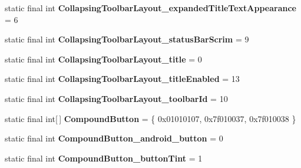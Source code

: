 \begin{DoxyCompactItemize}
\item 
\hypertarget{classandroid_1_1support_1_1design_1_1_r_1_1styleable_a5810888dea70dffb7d52060a911d78aa}{}static final int {\bfseries Collapsing\+Toolbar\+Layout\+\_\+expanded\+Title\+Text\+Appearance} = 6\label{classandroid_1_1support_1_1design_1_1_r_1_1styleable_a5810888dea70dffb7d52060a911d78aa}

\item 
\hypertarget{classandroid_1_1support_1_1design_1_1_r_1_1styleable_a9a2f53e59e0ce9c6cf463013300a02a4}{}static final int {\bfseries Collapsing\+Toolbar\+Layout\+\_\+status\+Bar\+Scrim} = 9\label{classandroid_1_1support_1_1design_1_1_r_1_1styleable_a9a2f53e59e0ce9c6cf463013300a02a4}

\item 
\hypertarget{classandroid_1_1support_1_1design_1_1_r_1_1styleable_ad1b550d16ea4dc77615ec73e00300c09}{}static final int {\bfseries Collapsing\+Toolbar\+Layout\+\_\+title} = 0\label{classandroid_1_1support_1_1design_1_1_r_1_1styleable_ad1b550d16ea4dc77615ec73e00300c09}

\item 
\hypertarget{classandroid_1_1support_1_1design_1_1_r_1_1styleable_a653a3ffa637cabbce960a62a3ace1972}{}static final int {\bfseries Collapsing\+Toolbar\+Layout\+\_\+title\+Enabled} = 13\label{classandroid_1_1support_1_1design_1_1_r_1_1styleable_a653a3ffa637cabbce960a62a3ace1972}

\item 
\hypertarget{classandroid_1_1support_1_1design_1_1_r_1_1styleable_ad0d7a6184e81edf8ac6520145708bb74}{}static final int {\bfseries Collapsing\+Toolbar\+Layout\+\_\+toolbar\+Id} = 10\label{classandroid_1_1support_1_1design_1_1_r_1_1styleable_ad0d7a6184e81edf8ac6520145708bb74}

\item 
\hypertarget{classandroid_1_1support_1_1design_1_1_r_1_1styleable_a1e3ef000b9dccc62673df5ec6d13a547}{}static final int\mbox{[}$\,$\mbox{]} {\bfseries Compound\+Button} = \{ 0x01010107, 0x7f010037, 0x7f010038 \}\label{classandroid_1_1support_1_1design_1_1_r_1_1styleable_a1e3ef000b9dccc62673df5ec6d13a547}

\item 
\hypertarget{classandroid_1_1support_1_1design_1_1_r_1_1styleable_a6d7b51f19ad5b7b394b8fc42c69a09ec}{}static final int {\bfseries Compound\+Button\+\_\+android\+\_\+button} = 0\label{classandroid_1_1support_1_1design_1_1_r_1_1styleable_a6d7b51f19ad5b7b394b8fc42c69a09ec}

\item 
\hypertarget{classandroid_1_1support_1_1design_1_1_r_1_1styleable_a25cff95b0d756209d7642094cbd4e19d}{}static final int {\bfseries Compound\+Button\+\_\+button\+Tint} = 1\label{classandroid_1_1support_1_1design_1_1_r_1_1styleable_a25cff95b0d756209d7642094cbd4e19d}


\end{DoxyCompactItemize}
